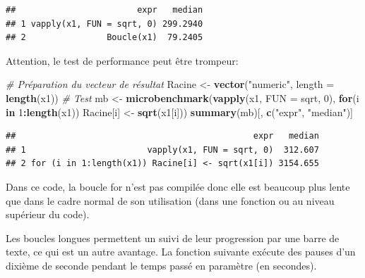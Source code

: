 \documentclass[
  12pt,
  french,
  a4paper,
  extrafontsizes,onecolumn,openright
  ]{memoir}
\newenvironment{Shaded}{\begin{snugshade}}{\end{snugshade}}
\newcommand{\CommentTok}[1]{\textcolor[rgb]{0.56,0.35,0.01}{\textit{#1}}}
\newcommand{\ControlFlowTok}[1]{\textcolor[rgb]{0.13,0.29,0.53}{\textbf{#1}}}
\newcommand{\DataTypeTok}[1]{\textcolor[rgb]{0.13,0.29,0.53}{#1}}
\newcommand{\DecValTok}[1]{\textcolor[rgb]{0.00,0.00,0.81}{#1}}
\newcommand{\KeywordTok}[1]{\textcolor[rgb]{0.13,0.29,0.53}{\textbf{#1}}}
\newcommand{\NormalTok}[1]{#1}
\newcommand{\OperatorTok}[1]{\textcolor[rgb]{0.81,0.36,0.00}{\textbf{#1}}}
\newcommand{\StringTok}[1]{\textcolor[rgb]{0.31,0.60,0.02}{#1}}
\newlength{\rf}
\begin{document}
\begin{verbatim}
##                        expr   median
## 1 vapply(x1, FUN = sqrt, 0) 299.2940
## 2                Boucle(x1)  79.2405
\end{verbatim}

\normalsize

Attention, le test de performance peut être trompeur:

\scriptsize

\begin{Shaded}
\begin{Highlighting}[]
\CommentTok{# Préparation du vecteur de résultat}
\NormalTok{Racine <-}\StringTok{ }\KeywordTok{vector}\NormalTok{(}\StringTok{"numeric"}\NormalTok{, }\DataTypeTok{length =} \KeywordTok{length}\NormalTok{(x1))}
\CommentTok{# Test}
\NormalTok{mb <-}\StringTok{ }\KeywordTok{microbenchmark}\NormalTok{(}\KeywordTok{vapply}\NormalTok{(x1, }\DataTypeTok{FUN =}\NormalTok{ sqrt, }\DecValTok{0}\NormalTok{), }
                     \ControlFlowTok{for}\NormalTok{(i }\ControlFlowTok{in} \DecValTok{1}\OperatorTok{:}\KeywordTok{length}\NormalTok{(x1)) }
\NormalTok{                       Racine[i] <-}\StringTok{ }\KeywordTok{sqrt}\NormalTok{(x1[i]))}
\KeywordTok{summary}\NormalTok{(mb)[, }\KeywordTok{c}\NormalTok{(}\StringTok{"expr"}\NormalTok{, }\StringTok{"median"}\NormalTok{)]}
\end{Highlighting}
\end{Shaded}

\begin{verbatim}
##                                               expr   median
## 1                        vapply(x1, FUN = sqrt, 0)  312.607
## 2 for (i in 1:length(x1)) Racine[i] <- sqrt(x1[i]) 3154.655
\end{verbatim}

\normalsize

Dans ce code, la boucle for n'est pas compilée donc elle est beaucoup plus lente que dans le cadre normal de son utilisation (dans une fonction ou au niveau supérieur du code).

Les boucles longues permettent un suivi de leur progression par une barre de texte, ce qui est un autre avantage.
La fonction suivante exécute des pauses d'un dixième de seconde pendant le temps passé en paramètre (en secondes).

\scriptsize
\end{document}
